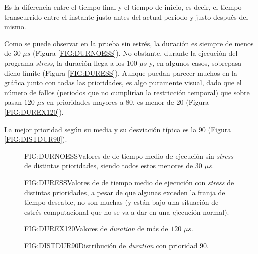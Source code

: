 
Es la diferencia entre el tiempo final y el tiempo de inicio, es decir, el tiempo transcurrido entre el instante justo antes del actual periodo y justo después del mismo.

Como se puede observar en la prueba sin estrés, la duración es siempre de menos de $30$ $\mu s$ (Figura \ref{FIG:DURNOESS}).  No obstante, durante la ejecución del programa \textit{stress}, la duración llega a los $100$ $\mu s$ y, en algunos casos, sobrepasa dicho límite (Figura \ref{FIG:DURESS}). Aunque puedan parecer muchos en la gráfica junto con todas las prioridades, es algo puramente visual, dado que el número de fallos (periodos que no cumplirían la restricción temporal) que sobre pasan $120$ $\mu s$ en prioridades mayores a $80$, es menor de $20$ (Figura \ref{FIG:DUREX120}).

La mejor prioridad según su media y su desviación típica es la $90$ (Figura \ref{FIG:DISTDUR90}).

\begin{figure}[Duration sin estrés]{FIG:DURNOESS}{Valores de de tiempo medio de ejecución sin \textit{stress} de distintas prioridades, siendo todos estos menores de $30$ $\mu s$.}
\end{figure}

\begin{figure}[Duration con estrés]{FIG:DURESS}{Valores de de tiempo medio de ejecución con \textit{stress} de distintas prioridades, a pesar de que algunas exceden la franja de tiempo deseable, no son muchas (y están bajo una situación de estrés computacional que no se va a dar en una ejecución normal).}
\end{figure}

\begin{figure}[Número de duration mayor que 120]{FIG:DUREX120}{Valores de \textit{duration} de más de $120$ $\mu s$.}
\end{figure}

\begin{figure}[Distribución de duration con prioridad 90]{FIG:DISTDUR90}{Distribución de \textit{duration} con prioridad $90$.}
\end{figure}

